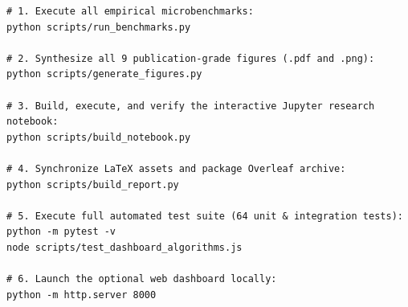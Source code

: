 \documentclass[11pt,a4paper,oneside]{report}
\theoremstyle{definition}
\begin{document}
\begin{verbatim}
# 1. Execute all empirical microbenchmarks:
python scripts/run_benchmarks.py

# 2. Synthesize all 9 publication-grade figures (.pdf and .png):
python scripts/generate_figures.py

# 3. Build, execute, and verify the interactive Jupyter research notebook:
python scripts/build_notebook.py

# 4. Synchronize LaTeX assets and package Overleaf archive:
python scripts/build_report.py

# 5. Execute full automated test suite (64 unit & integration tests):
python -m pytest -v
node scripts/test_dashboard_algorithms.js

# 6. Launch the optional web dashboard locally:
python -m http.server 8000
\end{verbatim}
\end{document}
